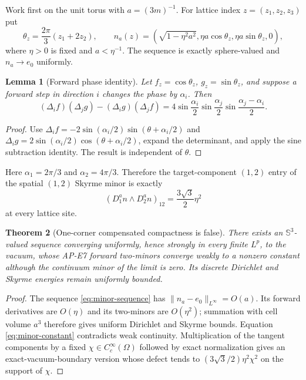 \documentclass[11pt]{article}
\numberwithin{equation}{section}
\newtheorem{theorem}{Theorem}[section]
\newtheorem{lemma}[theorem]{Lemma}
\theoremstyle{definition}
\theoremstyle{remark}
\newcommand{\SSS}{\mathbb S}
\newcommand{\ezer}{e_0}
\begin{document}
Work first on the unit torus with $a=(3m)^{-1}$.  For lattice index
$z=(z_1,z_2,z_3)$ put
\begin{equation}
 \theta_z=\frac{2\pi}{3}(z_1+2z_2),\qquad
 n_a(z)=\left(\sqrt{1-\eta^2a^2},
 \eta a\cos\theta_z,\eta a\sin\theta_z,0\right),
 \label{eq:minor-sequence}
\end{equation}
where $\eta>0$ is fixed and $a<\eta^{-1}$.  The sequence is exactly
sphere-valued and $n_a\to\ezer$ uniformly.

\begin{lemma}[Forward phase identity]
Let $f_z=\cos\theta_z$, $g_z=\sin\theta_z$, and suppose a forward step in
direction $i$ changes the phase by $\alpha_i$.  Then
\begin{equation}
 (\Delta_i f)(\Delta_j g)-(\Delta_i g)(\Delta_j f)
 =4\sin\frac{\alpha_i}{2}\sin\frac{\alpha_j}{2}
   \sin\frac{\alpha_j-\alpha_i}{2}.
 \label{eq:phase-identity}
\end{equation}
\end{lemma}

\begin{proof}
Use
$\Delta_i f=-2\sin(\alpha_i/2)\sin(\theta+\alpha_i/2)$ and
$\Delta_i g=2\sin(\alpha_i/2)\cos(\theta+\alpha_i/2)$, expand the determinant,
and apply the sine subtraction identity.  The result is independent of
$\theta$.
\end{proof}

Here $\alpha_1=2\pi/3$ and $\alpha_2=4\pi/3$.  Therefore the target-component
$(1,2)$ entry of the spatial $(1,2)$ Skyrme minor is exactly
\begin{equation}
 \left(D_1^an\wedge D_2^an\right)_{12}
 =\frac{3\sqrt3}{2}\eta^2
 \label{eq:minor-constant}
\end{equation}
at every lattice site.

\begin{theorem}[One-corner compensated compactness is false]
There exists an $\SSS^3$-valued sequence converging uniformly, hence strongly
in every finite $L^p$, to the vacuum, whose AP-E7 forward two-minors converge
weakly to a nonzero constant although the continuum minor of the limit is
zero.  Its discrete Dirichlet and Skyrme energies remain uniformly bounded.
\end{theorem}

\begin{proof}
The sequence \eqref{eq:minor-sequence} has
$\|n_a-\ezer\|_{L^\infty}=O(a)$.  Its forward derivatives are $O(\eta)$ and
its two-minors are $O(\eta^2)$; summation with cell volume $a^3$ therefore
gives uniform Dirichlet and Skyrme bounds.  Equation
\eqref{eq:minor-constant} contradicts weak continuity.  Multiplication of the
tangent components by a fixed $\chi\in C_c^\infty(\Omega)$ followed by exact
normalization gives an exact-vacuum-boundary version whose defect tends to
$(3\sqrt3/2)\eta^2\chi^2$ on the support of $\chi$.
\end{proof}
\end{document}
